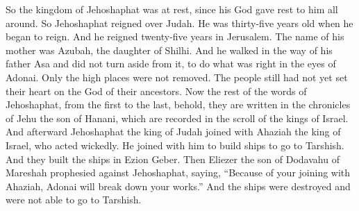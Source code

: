 \begin{biblechapter}
\verse So the kingdom of Jehoshaphat was at rest, since his God gave rest to him all around.
 So Jehoshaphat reigned over Judah. He was thirty-five years old when he began to reign. And he reigned twenty-five years in Jerusalem. The name of his mother was Azubah, the daughter of Shilhi.
\verse And he walked in the way of his father Asa and did not turn aside from it, to do what was right in the eyes of Adonai.
\verse Only the high places were not removed. The people still had not yet set their heart on the God of their ancestors.
\verse Now the rest of the words of Jehoshaphat, from the first to the last, behold, they are written in the chronicles of Jehu the son of Hanani, which are recorded in the scroll of the kings of Israel.
\verse And afterward Jehoshaphat the king of Judah joined with Ahaziah the king of Israel, who acted wickedly.
\verse He joined with him to build ships to go to Tarshish. And they built the ships in Ezion Geber.
\verse Then Eliezer the son of Dodavahu of Mareshah prophesied against Jehoshaphat, saying, “Because of your joining with Ahaziah, Adonai will break down your works.” And the ships were destroyed and were not able to go to Tarshish.
\end{biblechapter}

